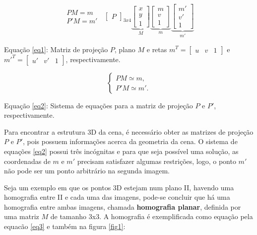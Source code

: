 \begin{equation}\label{eq1}
\begin{aligned}
	PM = m \\
	P'M = m'
\end{aligned} \; \;
\begin{bmatrix}
		P
\end{bmatrix}_{3x4}	
\underbrace{\begin{bmatrix}
		x \\ y \\ 1
\end{bmatrix}
}_{M}
\underbrace{\begin{bmatrix}
		m\\v\\1
\end{bmatrix}}_{m}	
\underbrace{\begin{bmatrix}
		m'\\v'\\1
	\end{bmatrix}}_{m'}
\end{equation}
 

Equação \eqref{eq1}: Matriz de projeção $P$, plano $M$ e retas $m^T = \begin{bmatrix}u & v & 1\end{bmatrix}$ e $m'^T = \begin{bmatrix}u' & v' & 1\end{bmatrix}$, respectivamente.

\begin{equation}\label{eq2}
\begin{cases}
P M \simeq m, \\
P' M \simeq m'.
\end{cases}
\end{equation}

Equação \eqref{eq2}: Sistema de equações para a matriz de projeção $P$ e $P'$, respectivamente.

Para encontrar a estrutura 3D da cena, é necessário obter as matrizes de projeção $P$ e $P'$, pois possuem informações acerca da geometria da cena. O sistema de equações \eqref{eq2} possui três incógnitas e para que seja possível uma solução, as coordenadas de $m$ e $m'$ precisam satisfazer algumas restrições, logo, o ponto $m'$ não pode ser um ponto arbitrário na segunda imagem.

Seja um exemplo em que os pontos 3D estejam num plano II, havendo uma homografia \cite{Faugeras-Geometry} entre II e cada uma das imagens, pode-se concluir que há uma homografia entre ambas imagens, chamada \textbf{homografia planar}, definida por uma matriz $M$ de tamanho 3x3. A homografia é exemplificada como equação pela equacão \eqref{eq3} e também na figura \ref{fig1}:

